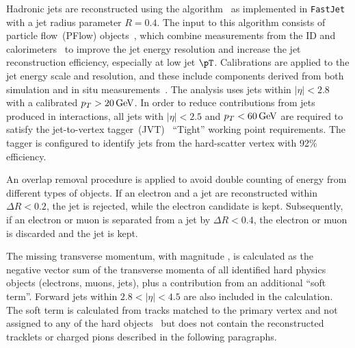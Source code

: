 Hadronic jets are reconstructed using the \antikt algorithm~\cite{Cacciari:2008gp} as implemented in \texttt{FastJet}~\cite{Fastjet} with a jet radius parameter $R = 0.4$. The input to this algorithm consists of particle flow~(PFlow) objects~\cite{PERF-2015-09}, which combine measurements from the ID and calorimeters~\cite{PERF-2014-07} to improve the jet energy resolution and increase the jet reconstruction efficiency, especially at low jet $\pT$. Calibrations are applied to the jet energy scale and resolution, and these include components derived from both simulation and in situ measurements~\cite{JETM-2018-05}. The analysis uses jets within $|\eta| < 2.8$ with a calibrated $p_T > 20\,\text{GeV}$. In order to reduce contributions from jets produced in \pileup interactions, all jets with $|\eta| < 2.5$ and $p_T < 60\,\text{GeV}$ are required to satisfy the jet-to-vertex tagger~(JVT)~\cite{PERF-2014-03} \enquote{Tight} working point requirements. The tagger is configured to identify jets from the hard-scatter vertex with 92\% efficiency.

An overlap removal procedure is applied to avoid double counting of energy from different types of objects. If an electron and a jet are reconstructed within $\Delta R < 0.2$, the jet is rejected, while the electron candidate is kept. Subsequently, if an electron or muon is separated from a jet by $\Delta R < 0.4$, the electron or muon is discarded and the jet is kept.

The missing transverse momentum, with magnitude \met, is calculated as the negative vector sum of the transverse momenta of all identified hard physics objects (electrons, muons, jets), plus a contribution from an additional \enquote{soft term}. Forward jets within $2.8 < |\eta| < 4.5$ are also included in the \met calculation. The soft term is calculated from tracks matched to the primary vertex and not assigned to any of the hard objects~\cite{JETM-2020-03} but does not contain the reconstructed tracklets or charged pions described in the following paragraphs. 


